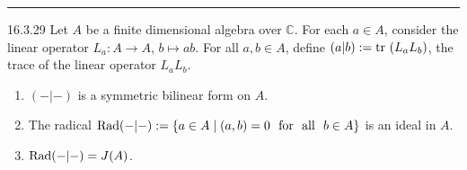 \documentclass[a4paper, 12pt]{article}
\begin{document}
\noindent\rule{7in}{2.8pt}
\begin{problem}{16.3.29}
Let \(A\) be a finite dimensional algebra over \(\mathbb{C}\). For each \(a\in A\), consider the linear operator \(L_a:A\rightarrow A\), \(b\mapsto ab\). For all 
\(a,b\in A\), define \((a|b):=\text{tr}\ (L_aL_b)\), the trace of the linear operator \(L_aL_b\).
\begin{enumerate}[(1)]
\item \((-|-)\) is a symmetric bilinear form on \(A\). 
\item The radical \(\text{Rad}(-|-):=\left\{ a\in A\mid (a,b)=0\ \ \text{for}\ \ \text{all}\ \ b\in A \right\}\) is an ideal in \(A\). 
\item \(\text{Rad}(-|-)=J(A)\).
\end{enumerate}
\end{problem}
\end{document}
